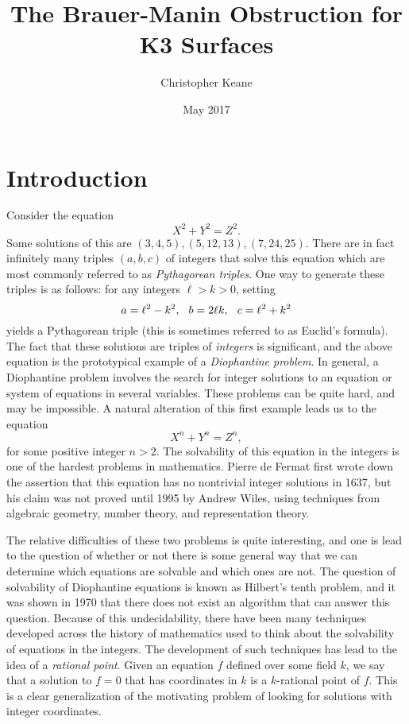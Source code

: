 \documentclass[12pt,twoside]{reedthesis}
\title{The Brauer-Manin Obstruction for K3 Surfaces}
\author{Christopher Keane}
\date{May 2017}
\theoremstyle{plain}
\theoremstyle{definition}
\theoremstyle{remark}
\begin{document}
\maketitle
\frontmatter 
\pagestyle{empty} 
\tableofcontents
\chapter*{Introduction}
Consider the equation
\[
X^2+Y^2=Z^2.
\]
Some solutions of this are $(3,4,5), (5,12,13), (7,24,25)$. There are in fact infinitely many triples $(a,b,c)$ of integers that solve this equation which are most commonly referred to as \emph{Pythagorean triples}. One way to generate these triples is as follows: for any integers $\ell>k>0$, setting
\[
a=\ell^2-k^2,\hspace{0.25cm} b=2\ell k,\hspace{0.25cm} c=\ell^2+k^2
\] 
yields a Pythagorean triple (this is sometimes referred to as Euclid's formula). The fact that these solutions are triples of \emph{integers} is significant, and the above equation is the prototypical example of a \emph{Diophantine problem}. In general, a Diophantine problem involves the search for integer solutions to an equation or system of equations in several variables. These problems can be quite hard, and may be impossible. A natural alteration of this first example leads us to the equation
\[
X^n+Y^n=Z^n,
\]
for some positive integer $n>2$. The solvability of this equation in the integers is one of the hardest problems in mathematics. Pierre de Fermat first wrote down the assertion that this equation has no nontrivial integer solutions in 1637, but his claim was not proved until 1995 by Andrew Wiles, using techniques from algebraic geometry, number theory, and representation theory. 

The relative difficulties of these two problems is quite interesting, and one is lead to the question of whether or not there is some general way that we can determine which equations are solvable and which ones are not. The question of solvability of Diophantine equations is known as Hilbert's tenth problem, and it was shown in 1970 that there does not exist an algorithm that can answer this question. Because of this undecidability, there have been many techniques developed across the history of mathematics used to think about the solvability of equations in the integers. The development of such techniques has lead to the idea of a \emph{rational point}. Given an equation $f$ defined over some field $k$, we say that a solution to $f=0$ that has coordinates in $k$ is a $k$-rational point of $f$. This is a clear generalization of the motivating problem of looking for solutions with integer coordinates. 
\end{document}
